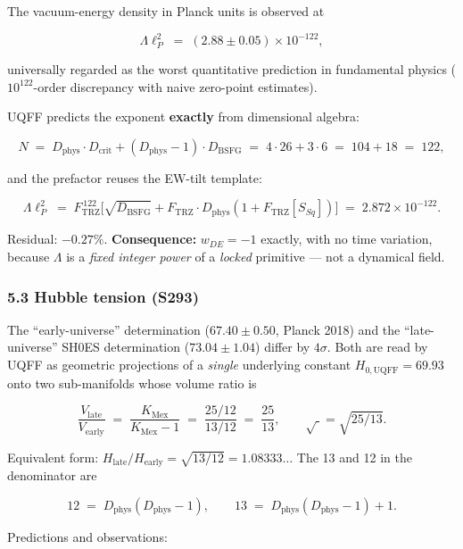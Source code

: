 \documentclass[
]{article}
\begin{document}
The vacuum-energy density in Planck units is observed at

\[
\Lambda\ell_P^2 \;=\; (2.88 \pm 0.05)\times 10^{-122},
\]

universally regarded as the worst quantitative prediction in fundamental
physics (\(10^{122}\)-order discrepancy with naive zero-point
estimates).

UQFF predicts the exponent \textbf{exactly} from dimensional algebra:

\[
N \;=\; D_{\text{phys}}\cdot D_{\text{crit}} + (D_{\text{phys}}-1)\cdot D_{\text{BSFG}} \;=\; 4\cdot 26 + 3\cdot 6 \;=\; 104+18 \;=\; 122,
\]

and the prefactor reuses the EW-tilt template:

\[
\Lambda\ell_P^2 \;=\; F_{\text{TRZ}}^{\,122}\bigl[\sqrt{D_{\text{BSFG}}}+F_{\text{TRZ}}\cdot D_{\text{phys}}(1+F_{\text{TRZ}}[S_{Sq}])\bigr] \;=\; 2.872\times 10^{-122}.
\]

Residual: \(-0.27\%\). \textbf{Consequence:} \(w_{DE}=-1\) exactly, with
no time variation, because \(\Lambda\) is a \emph{fixed integer power}
of a \emph{locked} primitive --- not a dynamical field.

\subsubsection{5.3 Hubble tension (S293)}\label{hubble-tension-s293}

The ``early-universe'' determination (\(67.40\pm 0.50\), Planck 2018)
and the ``late-universe'' SH0ES determination (\(73.04\pm 1.04\)) differ
by \(4\sigma\). Both are read by UQFF as geometric projections of a
\emph{single} underlying constant \(H_{0,\text{UQFF}}=69.93\) onto two
sub-manifolds whose volume ratio is

\[
\frac{V_{\text{late}}}{V_{\text{early}}} \;=\; \frac{K_{\text{Mex}}}{K_{\text{Mex}}-1} \;=\; \frac{25/12}{13/12} \;=\; \frac{25}{13}, \qquad \sqrt{\;}\!=\!\sqrt{25/13}.
\]

Equivalent form:
\(H_{\text{late}}/H_{\text{early}}=\sqrt{13/12}=1.08333\ldots\) The 13
and 12 in the denominator are

\[
12 \;=\; D_{\text{phys}}(D_{\text{phys}}-1), \qquad 13 \;=\; D_{\text{phys}}(D_{\text{phys}}-1)+1.
\]

Predictions and observations:
\end{document}
